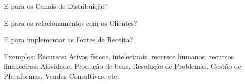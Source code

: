 \begin{commentA} \vspace{0.3cm} \noindent E para os Canais de Distribuição? \par \vspace{0.1cm} \end{commentA}


\begin{commentA} \vspace{0.3cm} \noindent E para os relacionamentos com os Clientes? \par \vspace{0.1cm} \end{commentA}


\begin{commentA} \vspace{0.3cm} \noindent E para implementar as Fontes de Receita? \par \vspace{0.1cm} \end{commentA}


\begin{commentA} \vspace{0.3cm} \noindent Exemplos:
Recursos: Ativos físicos, intelectuais, recursos humanos, recursos financeiros;
Atividade: Produção de bens, Resolução de Problemas, Gestão de Plataformas, Vendas Consultivas, etc. \par \vspace{0.1cm} \end{commentA}


